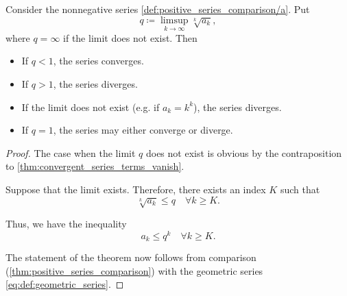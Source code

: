 \begin{proposition}\label{thm:cauchys_root_test}
  Consider the nonnegative series \cref{def:positive_series_comparison/a}. Put
  \begin{equation*}
    q \coloneqq \limsup_{k \to \infty} \sqrt[k]{a_k},
  \end{equation*}
  where \( q = \infty \) if the limit does not exist. Then
  \begin{itemize}
    \item If \( q < 1 \), the series converges.
    \item If \( q > 1 \), the series diverges.
    \item If the limit does not exist (e.g. if \( a_k = k^k \)), the series diverges.
    \item If \( q = 1 \), the series may either converge or diverge.
  \end{itemize}
\end{proposition}
\begin{proof}
  The case when the limit \( q \) does not exist is obvious by the contraposition to \cref{thm:convergent_series_terms_vanish}.

  Suppose that the limit exists. Therefore, there exists an index \( K \) such that
  \begin{equation*}
    \sqrt[k]{a_k} \leq q \quad\forall k \geq K.
  \end{equation*}

  Thus, we have the inequality
  \begin{equation*}
    a_k \leq q^k \quad\forall k \geq K.
  \end{equation*}

  The statement of the theorem now follows from comparison (\cref{thm:positive_series_comparison}) with the geometric series \eqref{eq:def:geometric_series}.
\end{proof}

